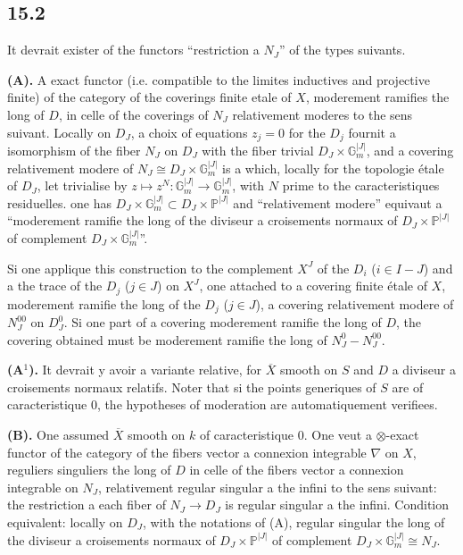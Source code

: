 \documentclass[12pt,a4paper]{article}
\theoremstyle{plain}
\theoremstyle{definition}
\theoremstyle{remark}
\newcommand{\bP}{\mathbb{P}}
\newcommand{\bG}{\mathbb{G}}
\begin{document}
\subsection*{15.2}

It devrait exister of the functors ``restriction a $N_J$'' of the types suivants.

\textbf{(A).} A exact functor (i.e. compatible to the limites inductives and projective finite) of the category of the coverings finite etale of $X$, moderement ramifies the long of $D$, in celle of the coverings of $N_J$ relativement moderes to the sens suivant. Locally on $D_J$, a choix of equations $z_j = 0$ for the $D_j$ fournit a isomorphism of the fiber $N_J$ on $D_J$ with the fiber trivial $D_J \times \bG_m^{|J|}$, and a covering relativement modere of $N_J \cong D_J \times \bG_m^{|J|}$ is a which, locally for the topologie étale of $D_J$, let trivialise by $z \mapsto z^N: \bG_m^{|J|} \to \bG_m^{|J|}$, with $N$ prime to the caracteristiques residuelles. one has $D_J \times \bG_m^{|J|} \subset D_J \times \bP^{|J|}$ and ``relativement modere'' equivaut a ``moderement ramifie the long of the diviseur a croisements normaux of $D_J \times \bP^{|J|}$ of complement $D_J \times \bG_m^{|J|}$''.

Si one applique this construction to the complement $X^J$ of the $D_i$ ($i \in I - J$) and a the trace of the $D_j$ ($j \in J$) on $X^J$, one attached to a covering finite étale of $X$, moderement ramifie the long of the $D_j$ ($j \in J$), a covering relativement modere of $N_J^{00}$ on $D_J^0$. Si one part of a covering moderement ramifie the long of $D$, the covering obtained must be moderement ramifie the long of $N_J^0 - N_J^{00}$.

\textbf{(A$^1$).} It devrait y avoir a variante relative, for $\overline{X}$ smooth on $S$ and $D$ a diviseur a croisements normaux relatifs. Noter that si the points generiques of $S$ are of caracteristique $0$, the hypotheses of moderation are automatiquement verifiees.

\textbf{(B).} One assumed $\overline{X}$ smooth on $k$ of caracteristique $0$. One veut a $\otimes$-exact functor of the category of the fibers vector a connexion integrable $\nabla$ on $X$, reguliers singuliers the long of $D$ in celle of the fibers vector a connexion integrable on $N_J$, relativement regular singular a the infini to the sens suivant: the restriction a each fiber of $N_J \to D_J$ is regular singular a the infini. Condition equivalent: locally on $D_J$, with the notations of (A), regular singular the long of the diviseur a croisements normaux of $D_J \times \bP^{|J|}$ of complement $D_J \times \bG_m^{|J|} \cong N_J$.
\end{document}
